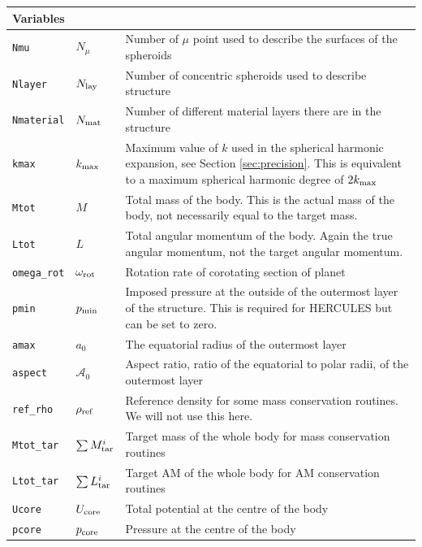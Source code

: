 \documentclass[11pt, oneside]{article}   	%
\begin{document}
\begin{longtable}{l l p{10cm}}
\multicolumn{3}{l}{Variables} \\
\hline
\texttt{Nmu} & $N_{\mu}$ & Number of $\mu$ point used to describe the surfaces of the spheroids \\
\texttt{Nlayer} & $N_{\rm lay}$ & Number of concentric spheroids used to describe structure \\
\texttt{Nmaterial} & $N_{\rm mat}$ & Number of different material layers there are in the structure \\
\texttt{kmax} & $k_{\rm max}$ & Maximum value of $k$ used in the spherical harmonic expansion, see Section \ref{sec:precision}. This is equivalent to a maximum spherical harmonic degree of $2k_{\rm max}$ \\
\texttt{Mtot} & $M$ & Total mass of the body. This is the actual mass of the body, not necessarily equal to the target mass.  \\
\texttt{Ltot} & $L$ & Total angular momentum of the body. Again the true angular momentum, not the target angular momentum. \\
\texttt{omega\_rot} & $\omega_{\rm rot}$ & Rotation rate of corotating section of planet \\
\texttt{pmin} & $p_{\rm min}$ & Imposed pressure at the outside of the outermost layer of the structure. This is required for HERCULES but can be set to zero. \\
\texttt{amax} & $a_0$ & The equatorial radius of the outermost layer \\
\texttt{aspect} & $\mathcal{A}_0$ & Aspect ratio, ratio of the equatorial to polar radii, of the outermost layer \\
\texttt{ref\_rho} & $\rho_{\rm ref}$ & Reference density for some mass conservation routines. We will not use this here. \\
\texttt{Mtot\_tar} & $\sum M_{\rm tar}^i$ & Target mass of the whole body for mass conservation routines \\
\texttt{Ltot\_tar} & $\sum L_{\rm tar}^i$ & Target AM of the whole body for AM conservation routines \\
\texttt{Ucore} & $U_{\rm core}$ & Total potential at the centre of the body \\
\texttt{pcore} & $p_{\rm core}$ & Pressure at the centre of the body \\


\end{longtable}
\end{document}

